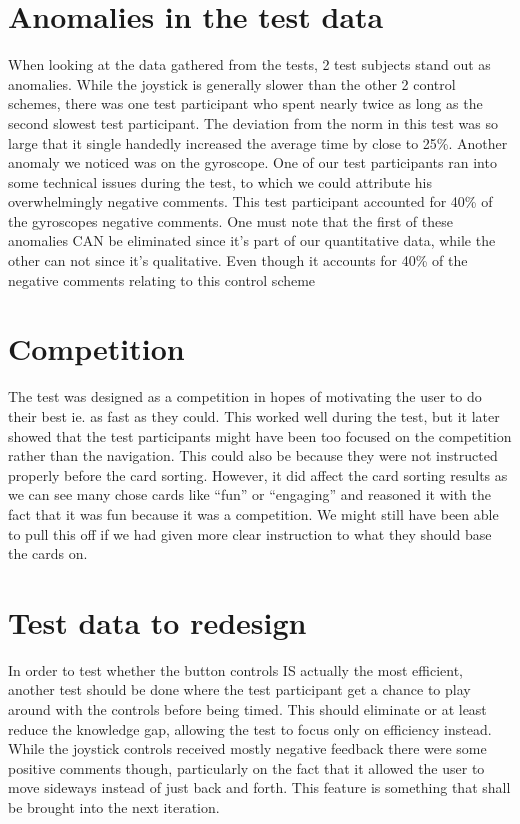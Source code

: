 \section{Anomalies in the test data}
When looking at the data gathered from the tests, 2 test subjects stand out as anomalies. While the joystick is generally slower than the other 2 control schemes, there was one test participant who spent nearly twice as long as the second slowest test participant.
The deviation from the norm in this test was so large that it single handedly increased the average time by close to 25\%.
Another anomaly we noticed was on the gyroscope. One of our test participants ran into some technical issues during the test, to which we could attribute his overwhelmingly negative comments. This test participant accounted for 40\% of the gyroscopes negative comments.
One must note that the first of these anomalies CAN be eliminated since it’s part of our quantitative data, while the other can not since it’s qualitative. Even though it accounts for 40\% of the negative comments relating to this control scheme
\section{Competition}
The test was designed as a competition in hopes of motivating the user to do their best ie. as fast as they could. This worked well during the test, but it later showed that the test participants might have been too focused on the competition rather than the navigation. This could also be because they were not instructed properly before the card sorting. However, it did affect the card sorting results as we can see many chose cards like “fun” or “engaging” and reasoned it with the fact that it was fun because it was a competition. 
We might still have been able to pull this off if we had given more clear instruction to what they should base the cards on. 
\section{Test data to redesign}
In order to test whether the button controls IS actually the most efficient, another test should be done where the test participant get a chance to play around with the controls before being timed. This should eliminate or at least reduce the knowledge gap, allowing the test to focus only on efficiency instead.
While the joystick controls received mostly negative feedback there were some positive comments though, particularly on the fact that it allowed the user to move sideways instead of just back and forth. This feature is something that shall be brought into the next iteration.


